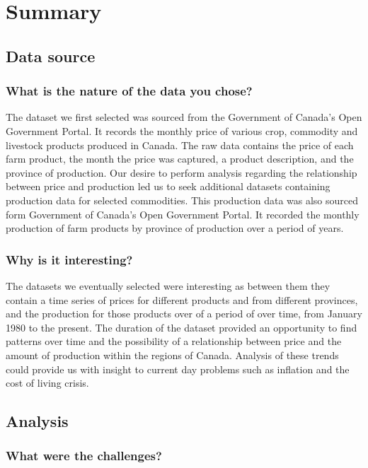 \section{Summary}

\subsection{Data source}

\subsubsection{What is the nature of the data you chose?}

The dataset we first selected was sourced from the Government of Canada's Open Government Portal. It records the monthly price of various crop, commodity and livestock products produced in Canada. The raw data contains the price of each farm product, the month the price was captured, a product description, and the province of production. Our desire to perform analysis regarding the relationship between price and production led us to seek additional datasets containing production data for selected commodities. This production data was also sourced form Government of Canada's Open Government Portal. It recorded the monthly production of farm products by province of production over a period of years.

\subsubsection{Why is it interesting?}

The datasets we eventually selected were interesting as between them they contain a time series of prices for different products and from different provinces, and the production for those products over of a period of over time, from January 1980 to the present. The duration of the dataset provided an opportunity to find patterns over time and the possibility of a relationship between price and the amount of production within the regions of Canada.  Analysis of these trends could provide us with insight to current day problems such as inflation and the cost of living crisis. 
\subsection{Analysis}

\subsubsection{What were the challenges?}

